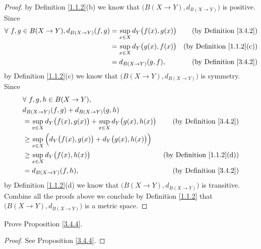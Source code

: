\begin{proof}
    by Definition \ref{1.1.2}(b) we know that \(\big(B(X \to Y), d_{B(X \to Y)}\big)\) is positive.
    Since
    \begin{align*}
        \forall\ f, g \in B(X \to Y), d_{B(X \to Y)}(f, g) & = \sup_{x \in X} d_Y\big(f(x), g(x)\big) & \text{(by Definition \ref{3.4.2})}    \\
                                                           & = \sup_{x \in X} d_Y\big(g(x), f(x)\big) & \text{(by Definition \ref{1.1.2}(c))} \\
                                                           & = d_{B(X \to Y)}(g, f),                  & \text{(by Definition \ref{3.4.2})}
    \end{align*}
    by Definition \ref{1.1.2}(c) we know that \(\big(B(X \to Y), d_{B(X \to Y)}\big)\) is symmetry.
    Since
    \begin{align*}
         & \forall\ f, g, h \in B(X \to Y),                                                                                          \\
         & d_{B(X \to Y)}(f, g) + d_{B(X \to Y)}(g, h)                                                                               \\
         & = \sup_{x \in X} d_Y\big(f(x), g(x)\big) + \sup_{x \in X} d_Y\big(g(x), h(x)\big) & \text{(by Definition \ref{3.4.2})}    \\
         & \geq \sup_{x \in X} \Big(d_Y\big(f(x), g(x)\big) + d_Y\big(g(x), h(x)\big)\Big)                                           \\
         & \geq \sup_{x \in X} d_Y\big(f(x), h(x)\big)                                       & \text{(by Definition \ref{1.1.2}(d))} \\
         & = d_{B(X \to Y)}(f, h),                                                           & \text{(by Definition \ref{3.4.2})}
    \end{align*}
    by Definition \ref{1.1.2}(d) we know that \(\big(B(X \to Y), d_{B(X \to Y)}\big)\) is transitive.
    Combine all the proofs above we conclude by Definition \ref{1.1.2} that \(\big(B(X \to Y), d_{B(X \to Y)}\big)\) is a metric space.
\end{proof}

\begin{exercise}\label{ex 3.4.2}
    Prove Proposition \ref{3.4.4}.
\end{exercise}

\begin{proof}
    See Proposition \ref{3.4.4}.
\end{proof}

